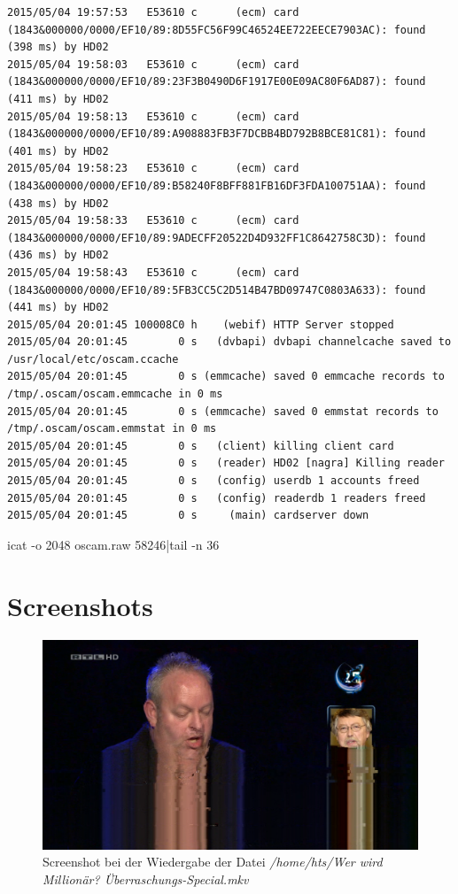 \begin{cmd}[H]
\begin{Verbatim}[fontsize=\tiny]
2015/05/04 19:57:53   E53610 c      (ecm) card (1843&000000/0000/EF10/89:8D55FC56F99C46524EE722EECE7903AC): found (398 ms) by HD02
2015/05/04 19:58:03   E53610 c      (ecm) card (1843&000000/0000/EF10/89:23F3B0490D6F1917E00E09AC80F6AD87): found (411 ms) by HD02
2015/05/04 19:58:13   E53610 c      (ecm) card (1843&000000/0000/EF10/89:A908883FB3F7DCBB4BD792B8BCE81C81): found (401 ms) by HD02
2015/05/04 19:58:23   E53610 c      (ecm) card (1843&000000/0000/EF10/89:B58240F8BFF881FB16DF3FDA100751AA): found (438 ms) by HD02
2015/05/04 19:58:33   E53610 c      (ecm) card (1843&000000/0000/EF10/89:9ADECFF20522D4D932FF1C8642758C3D): found (436 ms) by HD02
2015/05/04 19:58:43   E53610 c      (ecm) card (1843&000000/0000/EF10/89:5FB3CC5C2D514B47BD09747C0803A633): found (441 ms) by HD02
2015/05/04 20:01:45 100008C0 h    (webif) HTTP Server stopped
2015/05/04 20:01:45        0 s   (dvbapi) dvbapi channelcache saved to /usr/local/etc/oscam.ccache
2015/05/04 20:01:45        0 s (emmcache) saved 0 emmcache records to /tmp/.oscam/oscam.emmcache in 0 ms
2015/05/04 20:01:45        0 s (emmcache) saved 0 emmstat records to /tmp/.oscam/oscam.emmstat in 0 ms
2015/05/04 20:01:45        0 s   (client) killing client card
2015/05/04 20:01:45        0 s   (reader) HD02 [nagra] Killing reader
2015/05/04 20:01:45        0 s   (config) userdb 1 accounts freed
2015/05/04 20:01:45        0 s   (config) readerdb 1 readers freed
2015/05/04 20:01:45        0 s     (main) cardserver down
\end{Verbatim}
\caption{icat -o 2048 oscam.raw 58246|tail -n 36}
\label{cmd:oscam-logtail}
\end{cmd}

\section{Screenshots}

\begin{figure}[H]
\includegraphics[scale=0.5]{rtlhd-millionaer.png} 
\caption{Screenshot bei der Wiedergabe der Datei \textit{/home/hts/Wer wird Millionär? Überraschungs-Special.mkv}}
\label{fig:tvheadend-rtlhd}
\end{figure}
